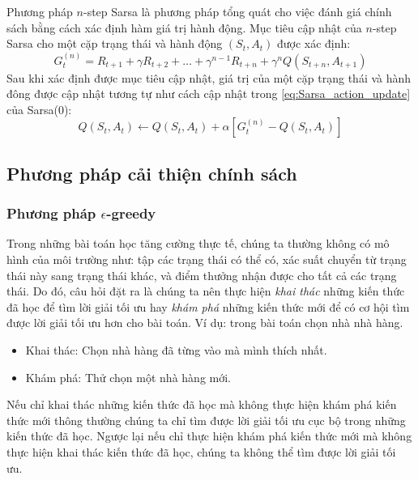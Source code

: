 Phương pháp $n$-step Sarsa là phương pháp tổng quát cho việc đánh giá chính sách bằng cách xác định hàm giá trị hành động. Mục tiêu cập nhật của $n$-step Sarsa cho một cặp trạng thái và hành động $(\mathit{S}_t, \mathit{A}_t)$ được xác định:
\begin{equation}
G_{t}^{(n)} = \mathit{R}_{t+1} + \gamma \mathit{R}_{t+2} + \dots + \gamma^{n-1} \mathit{R}_{t+n} + \gamma^{n} Q(\mathit{S}_{t+n}, \mathit{A}_{t+1})
\end{equation}
Sau khi xác định được mục tiêu cập nhật, giá trị của một cặp trạng thái và hành đông được cập nhật tương tự như cách cập nhật trong \ref{eq:Sarsa_action_update} của Sarsa(0):
\begin{equation}
Q(\mathit{S}_t, \mathit{A}_t) \leftarrow Q(\mathit{S}_t, \mathit{A}_t) + \alpha \left[G_{t}^{(n)} -  Q(\mathit{S}_t, \mathit{A}_t) \right]
\label{eq:n_Sarsa_update}
\end{equation}

\subsection{Phương pháp cải thiện chính sách}

\subsubsection*{Phương pháp $\epsilon$-greedy}
Trong những bài toán học tăng cường thực tế, chúng ta thường không có mô hình của môi trường như: tập các trạng thái có thể có, xác suất chuyển từ trạng thái này sang trạng thái khác, và điểm thưởng nhận được cho tất cả các trạng thái. Do đó, câu hỏi đặt ra là chúng ta nên thực hiện \textit{khai thác} những kiến thức đã học để tìm lời giải tối ưu hay \textit{khám phá} những kiến thức mới để có cơ hội tìm được lời giải tối ưu hơn cho bài toán. Ví dụ: trong bài toán chọn nhà nhà hàng.
\begin{itemize}
	\item Khai thác: Chọn nhà hàng đã từng vào mà mình thích nhất.
	\item Khám phá: Thử chọn một nhà hàng mới.
\end{itemize}
Nếu chỉ khai thác những kiến thức đã học mà không thực hiện khám phá kiến thức mới thông thường chúng ta chỉ tìm được lời giải tối ưu cục bộ trong những kiến thức đã học. Ngược lại nếu chỉ thực hiện khám phá kiến thức mới mà không thực hiện khai thác kiến thức đã học, chúng ta không thể tìm được lời giải tối ưu.

